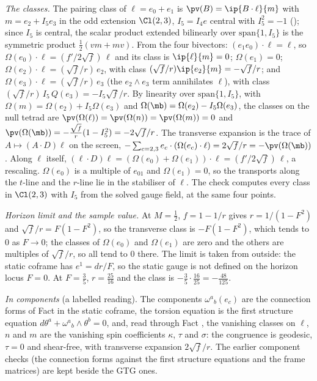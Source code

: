 \emph{The classes.} The pairing class of $\ell = e_{0} + e_{1}$ is $\pv(B) = \ip{B\cdot\ell}{m}$ with $m = e_{2} + I_{5}e_{3}$ in the odd extension $\Cl(2,3)$, $I_{5} = I_{4}e$ central with $I_{5}^{2} = -1$ (); since $I_{5}$ is central, the scalar product extended bilinearly over $\mathrm{span}\{1, I_{5}\}$ is the symmetric product $\tfrac12(vm + mv)$. From the four bivectors: $(e_{1}e_{0})\cdot\ell = \ell$, so $\Omega(e_{0})\cdot\ell = (f'/2\sqrt f)\,\ell$ and its class is $\ip{\ell}{m} = 0$; $\Omega(e_{1}) = 0$; $\Omega(e_{2})\cdot\ell = (\sqrt f/r)\,e_{2}$, with class $(\sqrt f/r)\ip{e_{2}}{m} = -\sqrt f/r$; and $\Omega(e_{3})\cdot\ell = (\sqrt f/r)\,e_{3}$ (the $e_{2}\wedge e_{3}$ term annihilates $\ell$), with class $(\sqrt f/r)\,I_{5}\,Q(e_{3}) = -I_{5}\sqrt f/r$. By linearity over $\mathrm{span}\{1, I_{5}\}$, with $\Omega(m) = \Omega(e_{2}) + I_{5}\Omega(e_{3})$ and $\Omega(\mb) = \Omega(e_{2}) - I_{5}\Omega(e_{3})$, the classes on the null tetrad are $\pv(\Omega(\ell)) = \pv(\Omega(n)) = \pv(\Omega(m)) = 0$ and $\pv(\Omega(\mb)) = -\tfrac{\sqrt f}{r}(1 - I_{5}^{2}) = -2\sqrt f/r$. The transverse expansion is the trace of $A \mapsto (A\cdot D)\ell$ on the screen, $-\sum_{c = 2,3} e_{c}\cdot(\Omega(e_{c})\cdot\ell) = 2\sqrt f/r = -\pv(\Omega(\mb))$. Along $\ell$ itself, $(\ell\cdot D)\ell = (\Omega(e_{0}) + \Omega(e_{1}))\cdot\ell = (f'/2\sqrt f)\,\ell$, a rescaling. $\Omega(e_{0})$ is a multiple of $e_{01}$ and $\Omega(e_{1}) = 0$, so the transports along the $t$-line and the $r$-line lie in the stabiliser of $\ell$. The check computes every class in $\Cl(2,3)$ with $I_{5}$ from the solved gauge field, at the same four points.

\emph{Horizon limit and the sample value.} At $M = \tfrac12$, $f = 1 - 1/r$ gives $r = 1/(1 - F^{2})$ and $\sqrt f/r = F(1 - F^{2})$, so the transverse class is $-F(1 - F^{2})$, which tends to $0$ as $F \to 0$; the classes of $\Omega(e_{0})$ and $\Omega(e_{1})$ are zero and the others are multiples of $\sqrt f/r$, so all tend to $0$ there. The limit is taken from outside: the static coframe has $e^{1} = dr/F$, so the static gauge is not defined on the horizon locus $F = 0$. At $F = \tfrac35$, $r = \tfrac{25}{16}$ and the class is $-\tfrac35\cdot\tfrac{16}{25} = -\tfrac{48}{125}$.

\emph{In components} (a labelled reading). The components $\omega^{a}{}_{b}(e_{c})$ are the connection forms of Fact  in the static coframe, the torsion equation is the first structure equation $d\theta^{a} + \omega^{a}{}_{b}\wedge\theta^{b} = 0$, and, read through Fact , the vanishing classes on $\ell$, $n$ and $m$ are the vanishing spin coefficients $\kappa$, $\tau$ and $\sigma$: the congruence is geodesic, $\tau = 0$ and shear-free, with transverse expansion $2\sqrt f/r$. The earlier component checks (the connection forms against the first structure equations and the frame matrices) are kept beside the GTG ones.
